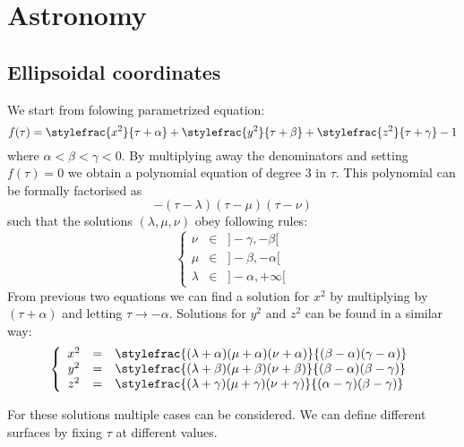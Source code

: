 \chapter{Astronomy}

\section{Ellipsoidal coordinates}

We start from folowing parametrized equation:
\begin{equation}\index{coordinates!ellipsoidal}
	\label{astronomy:ellipsoidal_defining_function}
	f(\tau) = \stylefrac{x^2}{\tau + \alpha} + \stylefrac{y^2}{\tau + \beta} + \stylefrac{z^2}{\tau + \gamma} - 1
\end{equation}
where $\alpha<\beta<\gamma<0$. By multiplying away the denominators and setting $f(\tau) = 0$ we obtain a polynomial equation of degree 3 in $\tau$. This polynomial can be formally factorised as
\begin{equation}
	-(\tau-\lambda)(\tau-\mu)(\tau-\nu)
\end{equation}
such that the solutions $(\lambda, \mu, \nu)$ obey following rules:
\[
	\left\{
    \begin{array}{ccl}
		\nu&\in&]-\gamma, -\beta[\\
    	\mu&\in&]-\beta, -\alpha[\\
    	\lambda&\in&]-\alpha, +\infty[
	\end{array}
    \right.
\]
From previous two equations we can find a solution for $x^2$ by multiplying by $(\tau+\alpha)$ and letting $\tau\rightarrow-\alpha$. Solutions for $y^2$ and $z^2$ can be found in a similar way:
\begin{equation}
	\label{astronomy:ellipsoidal_coordinates}
	\left\{
    \begin{array}{ccl}
		x^2 &=& \stylefrac{(\lambda + \alpha)(\mu + \alpha)(\nu + \alpha)}{(\beta - \alpha)(\gamma - \alpha)}\\
        y^2 &=& \stylefrac{(\lambda + \beta)(\mu + \beta)(\nu + \beta)}{(\beta - \alpha)(\beta - \gamma)}\\
        z^2 &=& \stylefrac{(\lambda + \gamma)(\mu + \gamma)(\nu + \gamma)}{(\alpha - \gamma)(\beta - \gamma)}
	\end{array}
    \right.
\end{equation}

\noindent For these solutions multiple cases can be considered. We can define different surfaces by fixing $\tau$ at different values.

